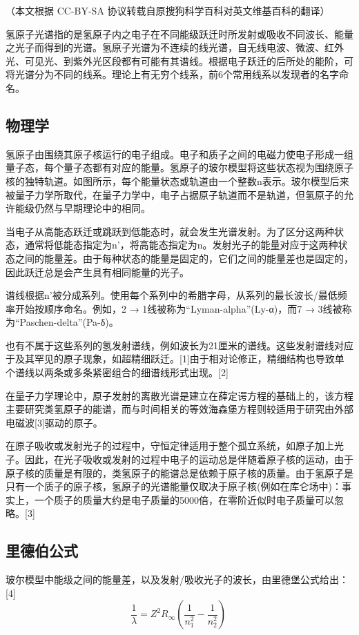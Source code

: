 （本文根据 CC-BY-SA 协议转载自原搜狗科学百科对英文维基百科的翻译）

氢原子光谱指的是氢原子内之电子在不同能级跃迁时所发射或吸收不同波长、能量之光子而得到的光谱。氢原子光谱为不连续的线光谱，自无线电波、微波、红外光、可见光、到紫外光区段都有可能有其谱线。根据电子跃迁的后所处的能阶，可将光谱分为不同的线系。理论上有无穷个线系，前6个常用线系以发现者的名字命名。

\subsection{物理学}
氢原子由围绕其原子核运行的电子组成。电子和质子之间的电磁力使电子形成一组量子态，每个量子态都有对应的能量。氢原子的玻尔模型将这些状态视为围绕原子核的独特轨道。如图所示，每个能量状态或轨道由一个整数n表示。玻尔模型后来被量子力学所取代，在量子力学中，电子占据原子轨道而不是轨道，但氢原子的允许能级仍然与早期理论中的相同。

当电子从高能态跃迁或跳跃到低能态时，就会发生光谱发射。为了区分这两种状态，通常将低能态指定为n’，将高能态指定为n。发射光子的能量对应于这两种状态之间的能量差。由于每种状态的能量是固定的，它们之间的能量差也是固定的，因此跃迁总是会产生具有相同能量的光子。

谱线根据n’被分成系列。使用每个系列中的希腊字母，从系列的最长波长/最低频率开始按顺序命名。例如，2 → 1线被称为“Lyman-alpha”(Ly-α)，而7 → 3线被称为“Paschen-delta”(Pa-δ)。

也有不属于这些系列的氢发射谱线，例如波长为21厘米的谱线。这些发射谱线对应于及其罕见的原子现象，如超精细跃迁。[1]由于相对论修正，精细结构也导致单个谱线以两条或多条紧密组合的细谱线形式出现。[2]

在量子力学理论中，原子发射的离散光谱是建立在薛定谔方程的基础上的，该方程主要研究类氢原子的能谱，而与时间相关的等效海森堡方程则较适用于研究由外部电磁波[3]驱动的原子。

在原子吸收或发射光子的过程中，守恒定律适用于整个孤立系统，如原子加上光子。因此，在光子吸收或发射的过程中电子的运动总是伴随着原子核的运动，由于原子核的质量是有限的，类氢原子的能谱总是依赖于原子核的质量。由于氢原子是只有一个质子的原子核，氢原子的光谱能量仅取决于原子核(例如在库仑场中)：事实上，一个质子的质量大约是电子质量的5000倍，在零阶近似时电子质量可以忽略。[3]

\subsection{里德伯公式}
玻尔模型中能级之间的能量差，以及发射/吸收光子的波长，由里德堡公式给出：[4]
\begin{equation}
\frac{1}{\lambda}=Z^2 R_{\infty}(\frac{1}{n_1^2}-\frac{1}{n_2^2})~
\end{equation}

